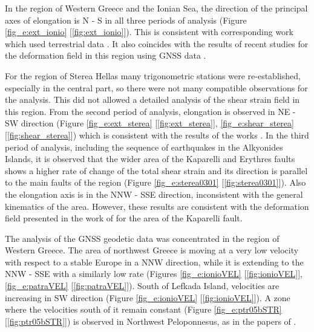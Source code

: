 \begin{extsum}
In the region of Western Greece and the Ionian Sea, the direction of the principal axes of elongation is N - S in all three periods of analysis (Figure \ref{fig_e:ext_ionio} [\ref{fig:ext_ionio}]). This is consistent with corresponding work which used terrestrial data \citep{Veis1992, Billiris1991, Davies199724571, stiros1993283}. It also coincides with the results of recent studies for the deformation field in this region using GNSS data \citep{Balodimou1994, Chousianitis2015, Floyd2010, Ganas201362, Hollenstein2008, Kahle199541, Perouse2012}.

For the region of Sterea Hellas many trigonometric stations were re-established, especially in the central part, so there were not many compatible observations for the analysis. This did not allowed a detailed analysis of the shear strain field in this region. From the second period of analysis, elongation is observed in NE - SW direction (Figure \ref{fig_e:ext_sterea} [\ref{fig:ext_sterea}], \ref{fig_e:shear_sterea} [\ref{fig:shear_sterea}]) which is consistent with the results of the works \citet{Veis1992, Davies199724571, Marinou2014}. In the third period of analysis, including the sequence of earthquakes in the Alkyonides Islands, it is observed that the wider area of ​​the Kaparelli and Erythres faults shows a higher rate of change of the total shear strain and its direction is parallel to the main faults of the region (Figure \ref{fig_e:sterea0301} [\ref{fig:sterea0301}]). Also the elongation axis is in the NNW - SSE direction, inconsistent with the general kinematics of the area. However, these results are consistent with the deformation field presented in the work of \citet{Marinou2015a} for the area of ​​the Kaparelli fault.

The analysis of the GNSS geodetic data was concentrated in the region of Western Greece. The area of ​​northwest Greece is moving at a very low velocity with respect to a stable Europe in a NNW direction, while it is extending to the NNW - SSE with a similarly low rate (Figures  \ref{fig_e:ionioVEL} [\ref{fig:ionioVEL}], \ref{fig_e:patraVEL} [\ref{fig:patraVEL}]). South of Lefkada Island, velocities are increasing in SW direction (Figure \ref{fig_e:ionioVEL} [\ref{fig:ionioVEL}]). A zone where the velocities south of it remain constant (Figure \ref{fig_e:ptr05bSTR} [\ref{fig:ptr05bSTR}]) is observed in Northwest Peloponnesus, as in the papers of \citet{Perouse2013,Floyd2010}.


\end{extsum}
